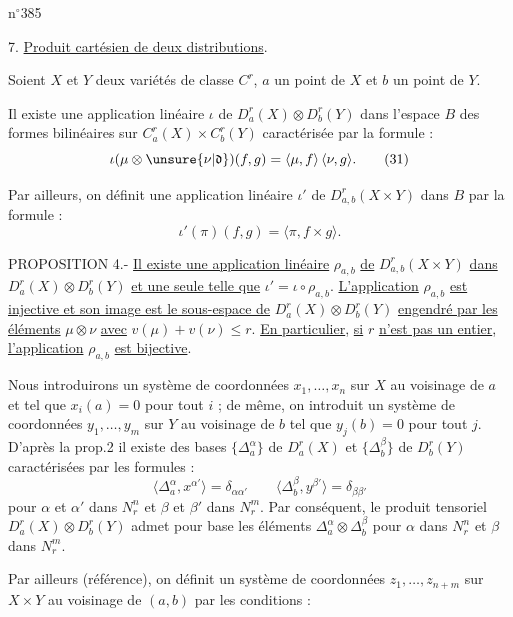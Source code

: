 
n$^{\circ}$385

7. \uline{Produit cartésien de deux distributions}.

Soient $X$ et $Y$ deux variétés de classe $C^r$, $a$ un point de $X$ et $b$ un point de $Y$.

Il existe une application linéaire $\iota$ de $D_a^r(X)\otimes D_b^r(Y)$ dans l'espace $B$ des formes bilinéaires sur $C_a^r(X)\times C_b^r(Y)$ caractérisée par la formule :
\[
\iota(\mu\otimes\unsure{\nu|\mathfrak{d}})(f,g)=\langle\mu,f\rangle\,\langle\nu,g\rangle.\tag*{(31)}
\]

Par ailleurs, on définit une application linéaire $\iota'$ de $D_{a,b}^r(X\times Y)$ dans $B$ par la formule :
\[
\iota'(\pi)(f,g)=\langle\pi,f\times g\rangle.\tag*{(32)}
\]

PROPOSITION 4.- \uline{Il existe une application linéaire} $\rho_{a,b}$ \uline{de} $D_{a,b}^r(X\times Y)$ \uline{dans} $D_a^r(X)\otimes D_b^r(Y)$ \uline{et une seule telle que} $\iota'=\iota\circ\rho_{a,b}$. \uline{L'application} $\rho_{a,b}$ \uline{est injective et son image est le sous-espace de} $D_a^r(X)\otimes D_b^r(Y)$ \uline{engendré par les éléments} $\mu\otimes\nu$ \uline{avec} $v(\mu)+v(\nu)\leq r$. \uline{En particulier}, \uline{si} $r$ \uline{n'est pas un entier}, \uline{l'application} $\rho_{a,b}$ \uline{est bijective}.

Nous introduirons un système de coordonnées $x_1,\ldots,x_n$ sur $X$ au voisinage de $a$ et tel que $x_i(a)=0$ pour tout $i$ ; de même, on introduit un système de coordonnées $y_1,\ldots,y_m$ sur $Y$ au voisinage de $b$ tel que $y_j(b)=0$ pour tout $j$. D'après la prop.2 il existe des bases $\{\Delta_a^\alpha\}$ de $D_a^r(X)$ et $\{\Delta_b^\beta\}$ de $D_b^r(Y)$ caractérisées par les formules :
\[
\langle\Delta_a^\alpha,x^{\alpha'}\rangle=\delta_{\alpha\alpha'}\qquad
\langle\Delta_b^\beta,y^{\beta'}\rangle=\delta_{\beta\beta'}\tag*{(33)}
\]
pour $\alpha$ et $\alpha'$ dans $N_r^n$ et $\beta$ et $\beta'$ dans $N_r^m$. Par conséquent, le produit tensoriel $D_a^r(X)\otimes D_b^r(Y)$ admet pour base les éléments $\Delta_a^\alpha\otimes\Delta_b^\beta$ pour $\alpha$ dans $N_r^n$ et $\beta$ dans $N_r^m$.

Par ailleurs (référence), on définit un système de coordonnées $z_1,\ldots,z_{n+m}$ sur $X\times Y$ au voisinage de $(a,b)$ par les conditions :
